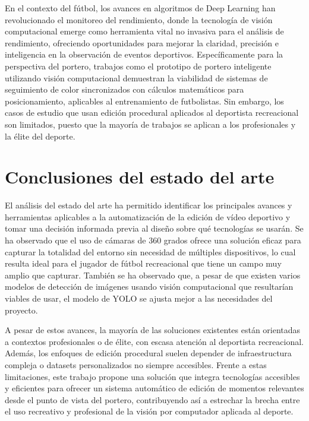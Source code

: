 En el contexto del fútbol, los avances en algoritmos de Deep Learning han revolucionado el monitoreo del rendimiento, donde la tecnología de visión computacional emerge como herramienta vital no invasiva para el análisis de rendimiento, ofreciendo oportunidades para mejorar la claridad, precisión e inteligencia en la observación de eventos deportivos. Específicamente para la perspectiva del portero, trabajos como el prototipo de portero inteligente \cite{prasetya2020} utilizando visión computacional demuestran la viabilidad de sistemas de seguimiento de color sincronizados con cálculos matemáticos para posicionamiento, aplicables al entrenamiento de futbolistas. Sin embargo, los casos de estudio que usan edición procedural aplicados al deportista recreacional son limitados, puesto que la mayoría de trabajos se aplican a los profesionales y la élite del deporte.

\section[Conclusiones]{Conclusiones del estado del arte}

El análisis del estado del arte ha permitido identificar los principales avances y herramientas aplicables a la automatización de la edición de vídeo deportivo y tomar una decisión informada previa al diseño sobre qué tecnologías se usarán. Se ha observado que el uso de cámaras de 360 grados ofrece una solución eficaz para capturar la totalidad del entorno sin necesidad de múltiples dispositivos, lo cual resulta ideal para el jugador de fútbol recreacional que tiene un campo muy amplio que capturar. También se ha observado que, a pesar de que existen varios modelos de detección de imágenes usando visión computacional que resultarían viables de usar, el modelo de YOLO se ajusta mejor a las necesidades del proyecto.

A pesar de estos avances, la mayoría de las soluciones existentes están orientadas a contextos profesionales o de élite, con escasa atención al deportista recreacional. Además, los enfoques de edición procedural suelen depender de infraestructura compleja o datasets personalizados no siempre accesibles. Frente a estas limitaciones, este trabajo propone una solución que integra tecnologías accesibles y eficientes para ofrecer un sistema automático de edición de momentos relevantes desde el punto de vista del portero, contribuyendo así a estrechar la brecha entre el uso recreativo y profesional de la visión por computador aplicada al deporte.
